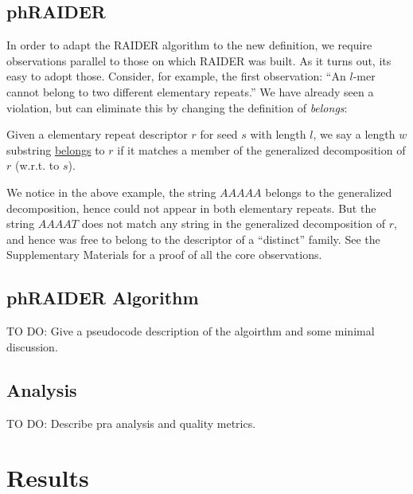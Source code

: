 \documentclass{bmcart}
\newcommand{\red}[1]{{\color{red}#1}}
\begin{document}
\subsection*{phRAIDER}

In order to adapt the RAIDER algorithm to the new definition, we
require observations parallel to those on which RAIDER was built.  As
it turns out, its easy to adopt those.  Consider, for example, the
first observation: ``An $l$-mer cannot belong to two different
elementary repeats.''  We have already seen a violation, but can
eliminate this by changing the definition of {\it belongs}:
\begin{definition}
  Given a elementary repeat descriptor $r$ for seed $s$ with length
  $l$, we say a length $w$ substring \underline{belongs} to $r$ if it
  matches a member of the generalized decomposition of $r$ (w.r.t. to
  $s$).
\end{definition}
We notice in the above example, the string $AAAAA$ belongs to the
generalized decomposition, hence could not appear in both elementary
repeats.  But the string $AAAAT$ does not match any string in the
generalized decomposition of $r$, and hence was free to belong to the
descriptor of a ``distinct'' family.  See the Supplementary Materials
for a proof of all the core observations.

\subsection*{phRAIDER Algorithm}

\red{
TO DO: Give a pseudocode description of the algoirthm and some minimal
discussion.
}

\subsection*{Analysis}

\red{
TO DO: Describe pra analysis and quality metrics.
}


\section*{Results}
\end{document}
